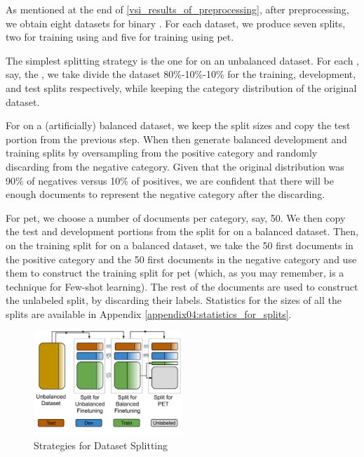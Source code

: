 \label{06_splitting_the_dataset}

As mentioned at the end of \headerName{} \ref{vsi_results_of_preprocessing}, after preprocessing, we obtain eight datasets for binary \textclassification{}. For each dataset, we produce seven splits, two for training using \finetuning{} and five for training using \gls{pet}.


The simplest splitting strategy is the one for \finetuning{} on an unbalanced dataset. For each \contentType{}, say, the \translationTitle{}, we take divide the dataset 80\%-10\%-10\%  for the training, development, and test splits respectively, while keeping the category distribution of the original dataset.

For \finetuning{} on a (artificially) balanced dataset, we keep the split sizes and copy the test portion from the previous step. When then generate balanced development and training splits by oversampling from the positive category and randomly discarding from the negative category. Given that the original distribution was 90\% of negatives versus 10\% of positives, we are confident that there will be enough documents to represent the negative category after the discarding.

For \gls{pet}, we choose a number of documents per category, say, 50. We then copy the test and development portions from the split for \finetuning{} on a balanced dataset. Then, on the training split for \finetuning{} on a balanced dataset, we take the 50 first documents in the positive category and the 50 first documents in the negative category and use them to construct the training split for \gls{pet} (which, as you may remember, is a technique for Few-shot learning). The rest of the documents are used to construct the unlabeled split, by discarding their labels. Statistics for the sizes of all the splits are available in Appendix \ref{appendix04:statistics_for_splits}.



\begin{figure}
    \centering
    \includegraphics[width=0.5\textwidth]{Figures/06/06_dataset_splits.png}
    \caption{Strategies for Dataset Splitting}
    \label{fig:06_strategies_for_dataset_splitting}
\end{figure}